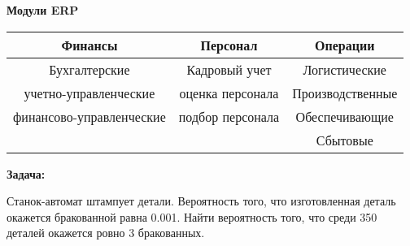 \textbf{Модули ERP}
\begin{table}[h]
  \centering
  \begin{tabular}{|c|c|c|}
    \hline
     \textbf{Финансы} & \textbf{Персонал} & \textbf{Операции} \\
    \hline
     Бухгалтерские & Кадровый учет & Логистические \\
     учетно-управленческие & оценка персонала  & Производственные  \\
     финансово-управленческие & подбор персонала  & Обеспечивающие \\
     & & Сбытовые \\
     \hline
  \end{tabular}
\end{table}

\textbf{Задача:}\par
Станок-автомат штампует детали. Вероятность того, что изготовленная деталь
окажется бракованной равна 0.001. Найти вероятность того, что среди 350 деталей
окажется ровно 3 бракованных.
